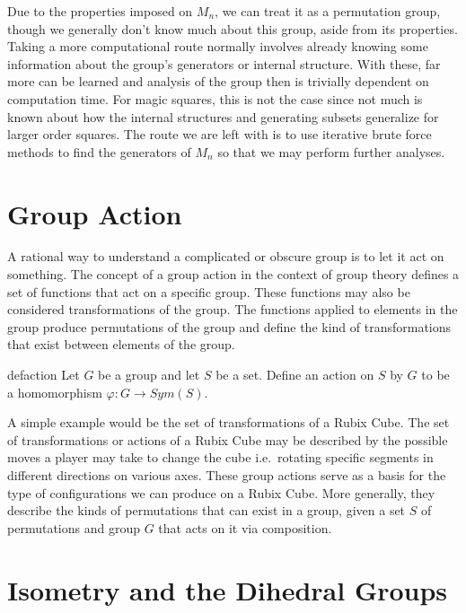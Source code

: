 \documentclass[12pt]{report}
\begin{document}
\par Due to the properties imposed on $M_n$, we can treat it as a permutation group, though we
generally don't know much about this group, aside from its properties. Taking a more computational
route normally involves already knowing some information about the group's generators or internal
structure. With these, far more can be learned and analysis of the group then is trivially
dependent on computation time. For magic squares, this is not the case since not much is known
about how the internal structures and generating subsets generalize for larger order squares. The
route we are left with is to use iterative brute force methods to find the generators of $M_n$ so
that we may perform further analyses.

\section{Group Action}

\par A rational way to understand a complicated or obscure group is to let it act on something. The
concept of a group action in the context of group theory defines a set of functions that act on a
specific group. These functions may also be considered transformations of the group. The functions
applied to elements in the group produce permutations of the group and define the kind of
transformations that exist between elements of the group.

\singlespacing{}
\begin{defbox}{}{defaction}
  Let $G$ be a group and let $S$ be a set. Define an action on $S$ by $G$ to be a homomorphism
  $\varphi:G\rightarrow Sym\left(S\right)$.
\end{defbox}
\doublespacing{}

A simple example would be the set of transformations of a Rubix Cube. The set of transformations or
actions of a Rubix Cube may be described by the possible moves a player may take to change the cube
i.e.\ rotating specific segments in different directions on various axes. These group actions serve
as a basis for the type of configurations we can produce on a Rubix Cube. More generally, they
describe the kinds of permutations that can exist in a group, given a set $S$ of permutations and
group $G$ that acts on it via composition.

\section{Isometry and the Dihedral Groups}
\end{document}
